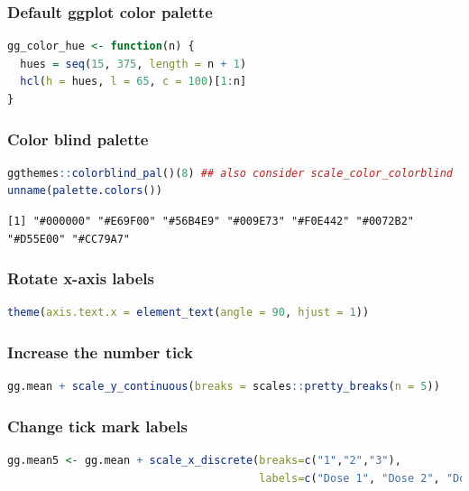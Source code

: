 \documentclass{article}
\begin{document}
\subsubsection{Default ggplot color palette}
\label{sec:org48ac00a}

\begin{lstlisting}[language=r,numbers=none]
gg_color_hue <- function(n) {
  hues = seq(15, 375, length = n + 1)
  hcl(h = hues, l = 65, c = 100)[1:n]
}
\end{lstlisting}
\subsubsection{Color blind palette}
\label{sec:org63058ac}
\begin{lstlisting}[language=r,numbers=none]
ggthemes::colorblind_pal()(8) ## also consider scale_color_colorblind
unname(palette.colors())
\end{lstlisting}

\label{}
\begin{verbatim}
[1] "#000000" "#E69F00" "#56B4E9" "#009E73" "#F0E442" "#0072B2" "#D55E00" "#CC79A7"
\end{verbatim}
\subsubsection{Rotate x-axis labels}
\label{sec:org136c029}
\begin{lstlisting}[language=r,numbers=none]
theme(axis.text.x = element_text(angle = 90, hjust = 1))
\end{lstlisting}
\subsubsection{Increase the number tick}
\label{sec:orgd92b3ca}

\begin{lstlisting}[language=r,numbers=none]
gg.mean + scale_y_continuous(breaks = scales::pretty_breaks(n = 5))
\end{lstlisting}
\subsubsection{Change tick mark labels}
\label{sec:orgcfb7424}

\begin{lstlisting}[language=r,numbers=none]
gg.mean5 <- gg.mean + scale_x_discrete(breaks=c("1","2","3"),
                                       labels=c("Dose 1", "Dose 2", "Dose 3"))
\end{lstlisting}
\end{document}
